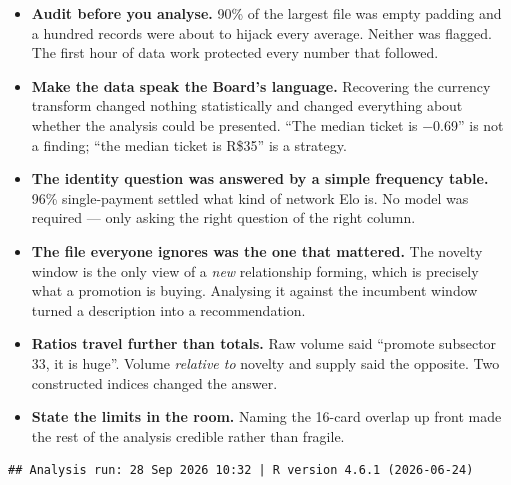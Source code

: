 \documentclass[
]{article}
\providecommand{\tightlist}{%
  \setlength{\itemsep}{0pt}\setlength{\parskip}{0pt}}
\begin{document}
\begin{itemize}
\tightlist
\item
  \textbf{Audit before you analyse.} 90\% of the largest file was empty
  padding and a hundred records were about to hijack every average.
  Neither was flagged. The first hour of data work protected every
  number that followed.
\item
  \textbf{Make the data speak the Board's language.} Recovering the
  currency transform changed nothing statistically and changed
  everything about whether the analysis could be presented. ``The median
  ticket is −0.69'' is not a finding; ``the median ticket is R\$35'' is
  a strategy.
\item
  \textbf{The identity question was answered by a simple frequency
  table.} 96\% single-payment settled what kind of network Elo is. No
  model was required --- only asking the right question of the right
  column.
\item
  \textbf{The file everyone ignores was the one that mattered.} The
  novelty window is the only view of a \emph{new} relationship forming,
  which is precisely what a promotion is buying. Analysing it against
  the incumbent window turned a description into a recommendation.
\item
  \textbf{Ratios travel further than totals.} Raw volume said ``promote
  subsector 33, it is huge''. Volume \emph{relative to} novelty and
  supply said the opposite. Two constructed indices changed the answer.
\item
  \textbf{State the limits in the room.} Naming the 16-card overlap up
  front made the rest of the analysis credible rather than fragile.
\end{itemize}

\begin{verbatim}
## Analysis run: 28 Sep 2026 10:32 | R version 4.6.1 (2026-06-24)
\end{verbatim}
\end{document}
